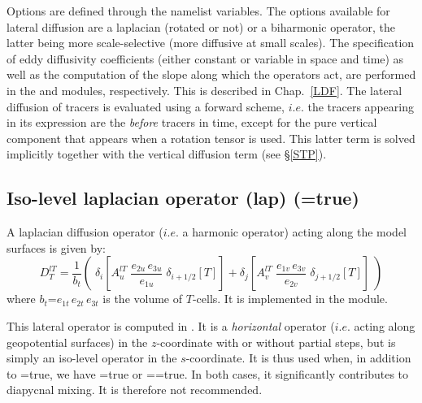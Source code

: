 \documentclass[NEMO_book]{subfiles}
\begin{document}
Options are defined through the   namelist variables.
The options available for lateral diffusion are a laplacian (rotated or not) 
or a biharmonic operator, the latter being more scale-selective (more 
diffusive at small scales). The specification of eddy diffusivity 
coefficients (either constant or variable in space and time) as well as the 
computation of the slope along which the operators act, are performed in the 
 and  modules, respectively. This is described in Chap.~\ref{LDF}. 
The lateral diffusion of tracers is evaluated using a forward scheme, 
$i.e.$ the tracers appearing in its expression are the \textit{before} tracers in time, 
except for the pure vertical component that appears when a rotation tensor 
is used. This latter term is solved implicitly together with the 
vertical diffusion term (see \S\ref{STP}).

\subsection   [Iso-level laplacian operator (lap) (\np{ln\_traldf\_lap})]
			{Iso-level laplacian operator (lap) (=true) }
\label{TRA_ldf_lap}

A laplacian diffusion operator ($i.e.$ a harmonic operator) acting along the model 
surfaces is given by: 
\begin{equation} \label{Eq_tra_ldf_lap}
D_T^{lT} =\frac{1}{b_t} \left( \;
   \delta _{i}\left[ A_u^{lT} \; \frac{e_{2u}\,e_{3u}}{e_{1u}} \;\delta _{i+1/2} [T] \right] 
+ \delta _{j}\left[ A_v^{lT} \;  \frac{e_{1v}\,e_{3v}}{e_{2v}} \;\delta _{j+1/2} [T] \right]  \;\right)
\end{equation}
where  $b_t$=$e_{1t}\,e_{2t}\,e_{3t}$  is the volume of $T$-cells. 
It is implemented in the  module.

This lateral operator is computed in . It is a \emph{horizontal} 
operator ($i.e.$ acting along geopotential surfaces) in the $z$-coordinate with 
or without partial steps, but is simply an iso-level operator in the $s$-coordinate. 
It is thus used when, in addition to =true, we have 
=true or ==true. 
In both cases, it significantly contributes to diapycnal mixing. 
It is therefore not recommended.
\end{document}
